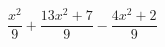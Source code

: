 \begin{ex}
	\begin{condition}
		\( \dfrac{x^2}{9}+\dfrac{13x^2+7}{9}-\dfrac{4x^2+2}{9} \)
	\end{condition}
\end{ex}